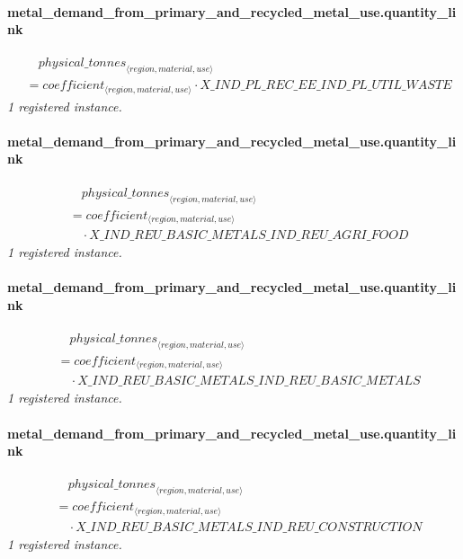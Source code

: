 \documentclass[11pt]{article}
\begin{document}
\paragraph{metal\_demand\_from\_primary\_and\_recycled\_metal\_use.quantity\_link}
\begin{align*}
&\quad {physical\_tonnes}_{\langle region, material, use\rangle}\\
&= coefficient_{\langle region, material, use\rangle} \cdot X\_IND\_PL\_REC\_EE\_IND\_PL\_UTIL\_WASTE
\end{align*}
\noindent\emph{1 registered instance.}\par
\paragraph{metal\_demand\_from\_primary\_and\_recycled\_metal\_use.quantity\_link}
\begin{align*}
&\quad {physical\_tonnes}_{\langle region, material, use\rangle}\\
&= coefficient_{\langle region, material, use\rangle}\\
&\quad {}\cdot X\_IND\_REU\_BASIC\_METALS\_IND\_REU\_AGRI\_FOOD
\end{align*}
\noindent\emph{1 registered instance.}\par
\paragraph{metal\_demand\_from\_primary\_and\_recycled\_metal\_use.quantity\_link}
\begin{align*}
&\quad {physical\_tonnes}_{\langle region, material, use\rangle}\\
&= coefficient_{\langle region, material, use\rangle}\\
&\quad {}\cdot X\_IND\_REU\_BASIC\_METALS\_IND\_REU\_BASIC\_METALS
\end{align*}
\noindent\emph{1 registered instance.}\par
\paragraph{metal\_demand\_from\_primary\_and\_recycled\_metal\_use.quantity\_link}
\begin{align*}
&\quad {physical\_tonnes}_{\langle region, material, use\rangle}\\
&= coefficient_{\langle region, material, use\rangle}\\
&\quad {}\cdot X\_IND\_REU\_BASIC\_METALS\_IND\_REU\_CONSTRUCTION
\end{align*}
\noindent\emph{1 registered instance.}\par
\end{document}
